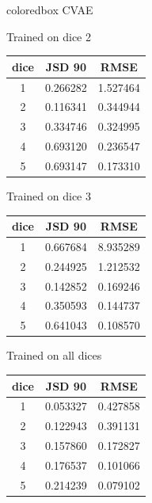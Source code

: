 \documentclass[xcolor=dvipsnames]{beamer}
\begin{document}
{  %
  \begin{beamercolorbox}[wd=\textwidth,sep=1ex]{coloredbox}
    \centering
    CVAE
  \end{beamercolorbox}
  \begin{minipage}{.3\linewidth}
    \centering
    Trained on dice 2\\[0.1cm]
    \begin{tabular}{ccc}
      dice & JSD 90 & RMSE\\
      \hline
      1 & 0.266282 & 1.527464 \\
      2 & 0.116341 & 0.344944 \\
      3 & 0.334746 & 0.324995 \\
      4 & 0.693120 & 0.236547 \\
      5 & 0.693147 & 0.173310
    \end{tabular}
  \end{minipage}\hfill%
  \begin{minipage}{.3\linewidth}
    \centering
    Trained on dice 3\\[0.1cm]
    \begin{tabular}{ccc}
      dice & JSD 90 & RMSE\\
      \hline
      1 &  0.667684 & 8.935289 \\
      2 &  0.244925 & 1.212532 \\
      3 &  0.142852 & 0.169246 \\
      4 &  0.350593 & 0.144737 \\
      5 &  0.641043 & 0.108570
    \end{tabular}
  \end{minipage}\hfill
  \begin{minipage}{.3\linewidth}
    \centering
    Trained on all dices\\[0.1cm]
    \begin{tabular}{ccc}
      dice & JSD 90 & RMSE\\
      \hline
      1 &  0.053327 & 0.427858 \\
      2 &  0.122943 & 0.391131 \\
      3 &  0.157860 & 0.172827 \\
      4 &  0.176537 & 0.101066 \\
      5 &  0.214239 & 0.079102
    \end{tabular}
  \end{minipage}
}
\end{document}
